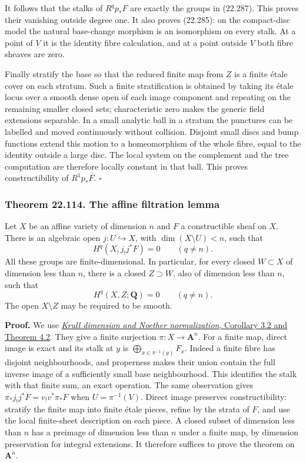 \documentclass[
  11pt,
  a4paper,
]{article}
\begin{document}
It follows that the stalks of \(R^qp_*F\) are exactly the groups in
(22.287). This proves their vanishing outside degree one. It also proves
(22.285): on the compact-disc model the natural base-change morphism is
an isomorphism on every stalk. At a point of \(V\) it is the identity
fibre calculation, and at a point outside \(V\) both fibre sheaves are
zero.

Finally stratify the base so that the reduced finite map from \(Z\) is a
finite étale cover on each stratum. Such a finite stratification is
obtained by taking its étale locus over a smooth dense open of each
image component and repeating on the remaining smaller closed sets;
characteristic zero makes the generic field extensions separable. In a
small analytic ball in a stratum the punctures can be labelled and moved
continuously without collision. Disjoint small discs and bump functions
extend this motion to a homeomorphism of the whole fibre, equal to the
identity outside a large disc. The local system on the complement and
the tree computation are therefore locally constant in that ball. This
proves constructibility of \(R^1p_*F\). \(\square\)

\subsubsection{Theorem 22.114. The affine filtration
lemma}\label{theorem-22.114.-the-affine-filtration-lemma}

Let \(X\) be an affine variety of dimension \(n\) and \(F\) a
constructible sheaf on \(X\). There is an algebraic open
\(j:U\hookrightarrow X\), with \(\dim(X\setminus U)<n\), such that \[
 H^q(X,j_!j^*F)=0\qquad(q\ne n).
 \tag{22.289}
\] All these groups are finite-dimensional. In particular, for every
closed \(W\subset X\) of dimension less than \(n\), there is a closed
\(Z\supset W\), also of dimension less than \(n\), such that \[
 H^q(X,Z;\mathbf Q)=0\qquad(q\ne n).
 \tag{22.290}
\] The open \(X\setminus Z\) may be required to be smooth.

\textbf{Proof.} We use
\href{https://kokunoyumeto.github.io/open-math-courses-public/courses/AG-CA/AG-CA-09.html\#3-normalization-that-respects-ideals}{\emph{Krull
dimension and Noether normalization}, Corollary 3.2 and Theorem 4.2}.
They give a finite surjection \(\pi:X\to\mathbf A^n\). For a finite map,
direct image is exact and its stalk at \(y\) is
\(\bigoplus_{x\in\pi^{-1}(y)}F_x\). Indeed a finite fibre has disjoint
neighbourhoods, and properness makes their union contain the full
inverse image of a sufficiently small base neighbourhood. This
identifies the stalk with that finite sum, an exact operation. The same
observation gives \(\pi_*j_!j^*F=v_!v^*\pi_*F\) when \(U=\pi^{-1}(V)\).
Direct image preserves constructibility: stratify the finite map into
finite étale pieces, refine by the strata of \(F\), and use the local
finite-sheet description on each piece. A closed subset of dimension
less than \(n\) has a preimage of dimension less than \(n\) under a
finite map, by dimension preservation for integral extensions. It
therefore suffices to prove the theorem on \(\mathbf A^n\).
\end{document}
